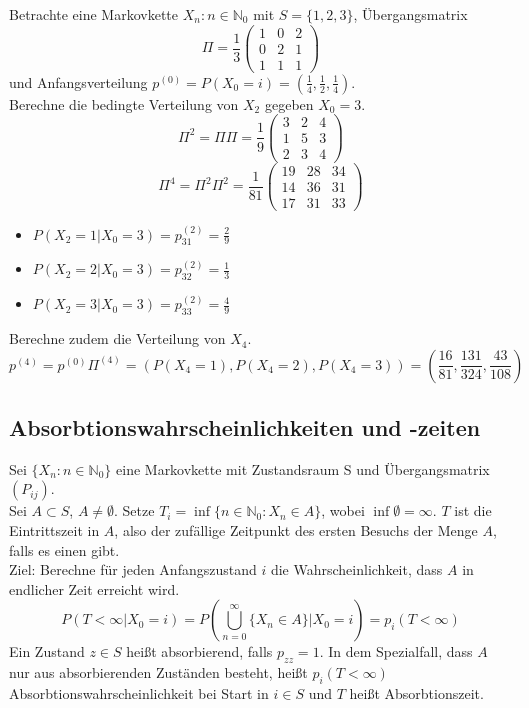 \documentclass[a4paper,12pt]{article}
\begin{document}
\begin{tcolorbox}[breakable, colframe=blue, colback=white, title=Beispiel 8]
Betrachte eine Markovkette ${X_n: n \in \mathbb{N}_0}$ mit $S= \{1, 2, 3\}$, Übergangsmatrix
$$
\Pi = \frac{1}{3}\begin{pmatrix}
1 & 0 & 2 \\
0 & 2 & 1 \\
1 & 1 & 1
\end{pmatrix}
$$
und Anfangsverteilung $p^{(0)} = P(X_0 = i) = \left(\frac{1}{4}, \frac{1}{2}, \frac{1}{4}\right)$.\\
Berechne die bedingte Verteilung von $X_2$ gegeben $X_0 = 3$.
$$
\Pi^2 = \Pi\Pi = \frac{1}{9} \begin{pmatrix}
3 & 2 & 4 \\
1 & 5 & 3 \\
2 & 3 & 4
\end{pmatrix}
$$
$$
\Pi^4 = \Pi^2\Pi^2 = \frac{1}{81} \begin{pmatrix}
19 & 28 & 34 \\
14 & 36 & 31 \\
17 & 31 & 33
\end{pmatrix}
$$
\begin{itemize}
	\item $P(X_2 = 1 | X_0 = 3) = p_{31}^{(2)} = \frac{2}{9}$
	\item $P(X_2 = 2 | X_0 = 3) = p_{32}^{(2)} = \frac{1}{3}$
	\item $P(X_2 = 3 | X_0 = 3) = p_{33}^{(2)} = \frac{4}{9}$
\end{itemize}
Berechne zudem die Verteilung von $X_4$.
$$
p^{(4)} = p^{(0)}\Pi^{(4)} = \left(P(X_4 = 1), P(X_4 = 2), P(X_4 = 3)\right)=  \left(\frac{16}{81}, \frac{131}{324}, \frac{43}{108}\right)
$$
\end{tcolorbox}




\subsection{Absorbtionswahrscheinlichkeiten und -zeiten}
Sei $\{X_n: n \in \mathbb{N}_0\}$ eine Markovkette mit Zustandsraum S und Übergangsmatrix $(P_{ij})$.\\
Sei $A \subset S$, $A \neq \emptyset$. Setze $T_i = \inf \{n \in \mathbb{N}_0: X_n \in A\}$, wobei $\inf \emptyset = \infty$. $T$ ist die Eintrittszeit in $A$, also der zufällige Zeitpunkt des ersten Besuchs der Menge $A$, falls es einen gibt.\\
Ziel: Berechne für jeden Anfangszustand $i$ die Wahrscheinlichkeit, dass $A$ in endlicher Zeit erreicht wird.
$$
P(T < \infty | X_0 = i) = P(\bigcup_{n = 0}^{\infty}\{X_n \in A\}| X_0 = i) = p_i(T < \infty)
$$
Ein Zustand $z \in S$ heißt absorbierend, falls $p_{zz} = 1$.
In dem Spezialfall, dass $A$ nur aus absorbierenden Zuständen besteht, heißt $p_i(T < \infty)$
Absorbtionswahrscheinlichkeit bei Start in $i \in S$ und $T$ heißt Absorbtionszeit.\\
\end{document}

